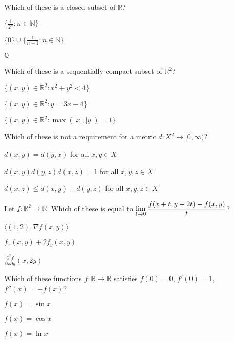 \documentclass[12pt]{exam}
\newcommand{\ds}{\ensuremath{\displaystyle}}
\newcommand{\<}{\langle}
\renewcommand{\>}{\rangle}
\begin{document}
\begin{questions}
\question[1]
Which of these is a closed subset of \(\mathbb R\)?
\begin{choices}
\item \(\{\frac{1}{2^n}:n\in\mathbb N\}\)
\item \(\{0\}\cup\{\frac{1}{n+1}:n\in\mathbb N\}\)
\item \(\mathbb Q\)
\end{choices}
\bigskip
\question[1]
Which of these is a sequentially compact subset of \(\mathbb R^2\)?
\begin{choices}
\item \(\{(x,y)\in\mathbb R^2: x^2+y^2<4\}\)
\item \(\{(x,y)\in\mathbb R^2: y=3x-4\}\)
\item \(\{(x,y)\in\mathbb R^2: \max(|x|,|y|)=1\}\)
\end{choices}
\bigskip
\question[1]
Which of these is not a requirement for a metric \(d:X^2\to[0,\infty)\)?
\begin{choices}
\item \(d(x,y)=d(y,x)\) for all \(x,y\in X\)
\item \(d(x,y)d(y,z)d(x,z)=1\) for all \(x,y,z\in X\)
\item \(d(x,z)\leq d(x,y)+d(y,z)\) for all \(x,y,z\in X\)
\end{choices}
\bigskip
\question[1]
Let \(f:\mathbb R^2\to\mathbb R\).
Which of these is equal to \(\ds\lim_{t\to0}\frac{f(x+t,y+2t)-f(x,y)}{t}\)?
\begin{choices}
\item \(\<(1,2),\nabla f(x,y)\>\)
\item \(f_x(x,y)+2f_y(x,y)\)
\item \(\frac{\partial^2 f}{\partial x\partial y}(x,2y)\)
\end{choices}
\bigskip
\question[1]
Which of these functions \(f:\mathbb R\to\mathbb R\) satisfies
\(f(0)=0\), \(f'(0)=1\), \(f''(x)=-f(x)\)?
\begin{choices}
\item \(f(x)=\sin x\)
\item \(f(x)=\cos x\)
\item \(f(x)=\ln x\)
\end{choices}
\end{questions}


\newpage

\begin{center}
\end{center}
\vspace{0.1in}
\end{document}
